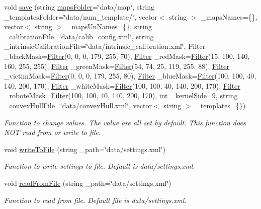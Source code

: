 \begin{DoxyCompactItemize}
void \mbox{\hyperlink{class_settings_a6e40d9eca9f6794dee65e519ea73bb24}{save}} (string \mbox{\hyperlink{class_settings_aeddfd4457036a14cb0a48d50d9e6ccfe}{maps\+Folder}}=\char`\"{}data/map\char`\"{}, string \+\_\+templates\+Folder=\char`\"{}data/num\+\_\+template/\char`\"{}, vector$<$ string $>$ \+\_\+maps\+Names=\{\}, vector$<$ string $>$ \+\_\+maps\+Un\+Names=\{\}, string \+\_\+calibration\+File=\char`\"{}data/calib\+\_\+config.\+xml\char`\"{}, string \+\_\+intrinsic\+Calibration\+File=\char`\"{}data/intrinsic\+\_\+calibration.\+xml\char`\"{}, Filter \+\_\+black\+Mask=\mbox{\hyperlink{class_filter}{Filter}}(0, 0, 0, 179, 255, 70), \mbox{\hyperlink{class_filter}{Filter}} \+\_\+red\+Mask=\mbox{\hyperlink{class_filter}{Filter}}(15, 100, 140, 160, 255, 255), \mbox{\hyperlink{class_filter}{Filter}} \+\_\+green\+Mask=\mbox{\hyperlink{class_filter}{Filter}}(54, 74, 25, 119, 255, 88), \mbox{\hyperlink{class_filter}{Filter}} \+\_\+victim\+Mask=\mbox{\hyperlink{class_filter}{Filter}}(0, 0, 0, 179, 255, 80), \mbox{\hyperlink{class_filter}{Filter}} \+\_\+blue\+Mask=\mbox{\hyperlink{class_filter}{Filter}}(100, 100, 40, 140, 200, 170), \mbox{\hyperlink{class_filter}{Filter}} \+\_\+white\+Mask=\mbox{\hyperlink{class_filter}{Filter}}(100, 100, 40, 140, 200, 170), \mbox{\hyperlink{class_filter}{Filter}} \+\_\+robote\+Mask=\mbox{\hyperlink{class_filter}{Filter}}(100, 100, 40, 140, 200, 170), \mbox{\hyperlink{draw_8hh_aa620a13339ac3a1177c86edc549fda9b}{int}} \+\_\+kernel\+Side=9, string \+\_\+convex\+Hull\+File=\char`\"{}data/convex\+Hull.\+xml\char`\"{}, vector$<$ string $>$ \+\_\+templates=\{\})
\begin{DoxyCompactList}\small\item\em Function to change values. The value are all set by default. This function does N\+OT read from or write to file. \end{DoxyCompactList}\item 
void \mbox{\hyperlink{class_settings_a1afc50e91691fae24114ba5e248dfd87}{write\+To\+File}} (string \+\_\+path=\char`\"{}data/settings.\+xml\char`\"{})
\begin{DoxyCompactList}\small\item\em Function to write settings to file. Default is data/settings.\+xml. \end{DoxyCompactList}\item 
void \mbox{\hyperlink{class_settings_a016ac9600bf42a2814847f14e5a3d58f}{read\+From\+File}} (string \+\_\+path=\char`\"{}data/settings.\+xml\char`\"{})
\begin{DoxyCompactList}\small\item\em Function to read from file. Default file is data/settings.\+xml. \end{DoxyCompactList}\item 

\end{DoxyCompactItemize}
